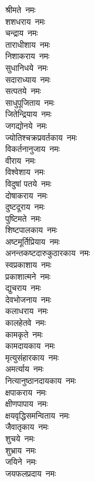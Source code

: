 \begin{flushleft}
\begin{multicols}{2}
श्रीमते~नमः\\
शशधराय~नमः\\
चन्द्राय~नमः\\
ताराधीशाय~नमः\\
निशाकराय~नमः\\
सुधानिधये~नमः\\
सदाराध्याय~नमः\\
सत्पतये~नमः\\
साधुपूजिताय~नमः\\
जितेन्द्रियाय~नमः\hfill{}\\
जगद्योनये~नमः\\
ज्योतिश्चक्रप्रवर्तकाय~नमः\\
विकर्तनानुजाय~नमः\\
वीराय~नमः\\
विश्वेशाय~नमः\\
विदुषां पतये~नमः\\
दोषाकराय~नमः\\
दुष्टदूराय~नमः\\
पुष्टिमते~नमः\\
शिष्टपालकाय~नमः\hfill{}\\
अष्टमूर्तिप्रियाय~नमः\\
अनन्तकष्टदारुकुठारकाय~नमः\\
स्वप्रकाशाय~नमः\\
प्रकाशात्मने~नमः\\
द्युचराय~नमः\\
देवभोजनाय~नमः\\
कलाधराय~नमः\\
कालहेतवे~नमः\\
कामकृते~नमः\\
कामदायकाय~नमः\hfill{}\\
मृत्युसंहारकाय~नमः\\
अमर्त्याय~नमः\\
नित्यानुष्ठानदायकाय~नमः\\
क्षपाकराय~नमः\\
क्षीणपापाय~नमः\\
क्षयवृद्धिसमन्विताय~नमः\\
जैवातृकाय~नमः\\
शुचये~नमः\\
शुभ्राय~नमः\\
जयिने~नमः\hfill{}\\
जयफलप्रदाय~नमः\\

\end{multicols}
\end{flushleft}
